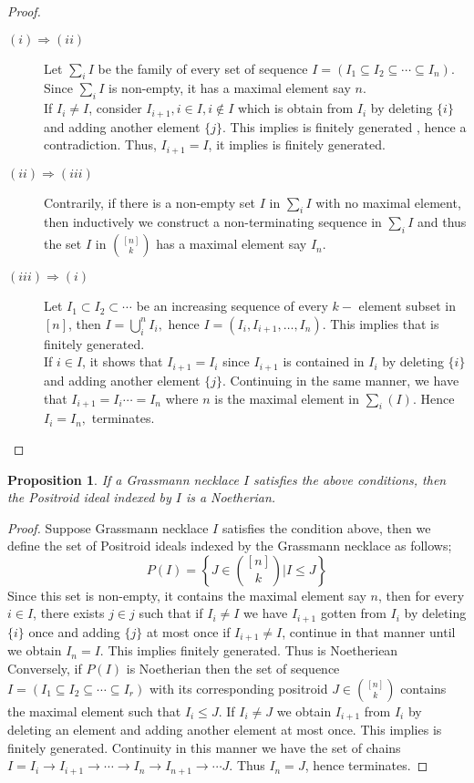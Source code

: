 \documentclass[12pt]{report}
\theoremstyle{theorem}
\newtheorem{proposition}[theorem]{Proposition}
\begin{document}
\begin{proof}
\begin{description}
\item[$(i)\Rightarrow (ii)$] Let $\sum_i I$ be the family of every set of sequence $I = (I_1\subseteq I_2\subseteq \cdots \subseteq I_n)$. Since $\sum_i I$ is non-empty, it has a maximal element say $n$.\\
If $I_i\neq I$, consider $I_{i+1}, i\in I, i\notin I$ which is obtain from $I_i$ by deleting $\{i\}$ and adding another element $\{j\}$. This implies is finitely generated , hence a contradiction. Thus, $I_{i+1} = I$, it implies is finitely generated.
\item[$(ii)\Rightarrow (iii)$] Contrarily, if there is a non-empty set $I$ in $\sum_{i}I$ with no maximal element, then inductively we construct a non-terminating sequence in $\sum_i I$ and thus the set $I$ in $\binom{[n]}{k}$ has a maximal element say $I_n$.
\item[$(iii)\Rightarrow (i)$] Let $I_1\subset I_2\subset\cdots$ be an increasing sequence of every $k-$ element subset in $[n]$, then $I =\bigcup_i^n{I_i},$ hence $I = (I_i, I_{i+1},\ldots,I_n)$. This implies that is finitely generated.\\
If $i\in I$, it shows that $I_{i+1} = I_i$ since $I_{i+1}$ is contained in $I_i$ by deleting $\{i\}$ and adding another element $\{j\}$. Continuing in the same manner, we have that $I_{i+1} = I_i \cdots = I_n$ where $n$ is the maximal element in $\sum_{i}(I)$. Hence $I_i = I_n,$ terminates. 
\end{description}
\end{proof}
\begin{proposition}
If a Grassmann necklace $I$ satisfies the above conditions, then the Positroid ideal indexed by $I$ is a Noetherian.
\end{proposition}

\begin{proof}
Suppose Grassmann necklace $I$ satisfies the condition above, then we define the set of Positroid ideals indexed by the Grassmann necklace as follows;
$$
P(I) = \left\{J\in\binom{[n]}{k}| I\leq J\right\}
$$
Since this set is non-empty, it contains the maximal element say $n$, then for every $i\in I$, there exists $j\in j$ such that if $I_i\neq I$ we have $I_{i+1}$ gotten from $I_i$ by deleting $\{i\}$ once and adding $\{j\}$ at most once if $I_{i+1}\neq I$, continue in that manner until we obtain $I_n = I.$ This implies finitely generated. Thus is Noetheriean\\
Conversely, if $P(I)$ is Noetherian then the set of sequence $I = (I_1\subseteq I_2\subseteq\cdots\subseteq I_r)$ with its corresponding positroid $J\in\binom{[n]}{k}$ contains the maximal element such that $I_i\leq J$. If $I_i\neq J$ we obtain $I_{i+1}$ from $I_i$ by deleting an element and adding another element at most once. This implies is finitely generated. Continuity in this manner we have the set of chains $I = I_{i}\longrightarrow I_{i+1}\longrightarrow \cdots \longrightarrow I_n\longrightarrow I_{n+1}\longrightarrow \cdots J.$ Thus $I_n = J$, hence terminates. 
\end{proof}
\end{document}
